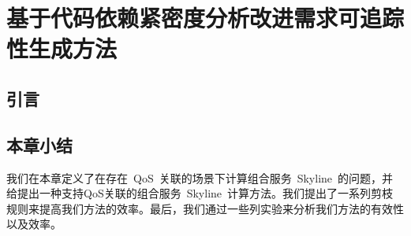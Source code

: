 \chapter{基于代码依赖紧密度分析改进需求可追踪性生成方法}

\section{引言}
\section{本章小结}

我们在本章定义了在存在~QoS~关联的场景下计算组合服务~Skyline~的问题，并给提出一种支持QoS关联的组合服务~Skyline~计算方法。我们提出了一系列剪枝规则来提高我们方法的效率。最后，我们通过一些列实验来分析我们方法的有效性以及效率。